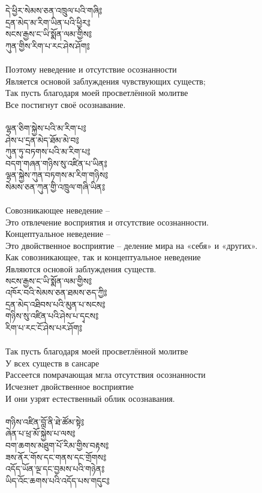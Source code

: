 \newpage
{\ti
དེ་ཕྱིར་སེམས་ཅན་འཁྲུལ་པའི་གཞི༔ \\
དྲན་མེད་མ་རིག་ཡིན་པའི་ཕྱིར༔ \\
སངས་རྒྱས་ང་ཡི་སྨོན་ལམ་གྱིས༔ \\
ཀུན་གྱིས་རིག་པ་རང་ཤེས་ཤོག༔}\\
\\
 Поэтому неведение и отсутствие осознанности \\
Является основой заблуждения чувствующих существ; \\
Так пусть благодаря моей просветлённой молитве \\
Все постигнут своё осознавание. \\
\\
{\ti
ལྷན་ཅིག་སྐྱེས་པའི་མ་རིག་པ༔ \\
ཤེས་པ་དྲན་མེད་ཐོམ་མེ་བ༔ \\
ཀུན་ཏུ་བཏགས་པའི་མ་རིག་པ༔ \\
བདག་གཞན་གཉིས་སུ་འཛིན་པ་ཡིན༔ \\
ལྷན་སྐྱེས་ཀུན་བཏགས་མ་རིག་གཉིས༔ \\
སེམས་ཅན་ཀུན་གྱི་འཁྲུལ་གཞི་ཡིན༔}\\
\\
Совозникающее неведение – \\
Это отвлечение восприятия и отсутствие осознанности. \\
Концептуальное неведение – \\
Это двойственное восприятие – деление мира на «себя» и «других». \\
Как совозникающее, так и концептуальное неведение \\
Являются основой заблуждения существ.\\
\newpage
{\ti
སངས་རྒྱས་ང་ཡི་སྨོན་ལམ་གྱིས༔ \\
འཁོར་བའི་སེམས་ཅན་ཐམས་ཅད་ཀྱི༔ \\
དྲན་མེད་འཐིབས་པའི་མུན་པ་སངས༔ \\
གཉིས་སུ་འཛིན་པའི་ཤེས་པ་དྭངས༔ \\
རིག་པ་རང་ངོ་ཤེས་པར་ཤོག༔}\\
\\
Так пусть благодаря моей просветлённой молитве \\
У всех существ в сансаре \\
Рассеется помрачающая мгла отсутствия осознанности \\
Исчезнет двойственное восприятие \\
И они узрят естественный облик осознавания.\\
\\
{\ti
གཉིས་འཛིན་བློ་ནི་ཐེ་ཚོམ་སྟེ༔ \\
ཞེན་པ་ཕྲ་མོ་སྐྱེས་པ་ལས༔ \\
བག་ཆགས་མཐུག་པོ་རིམ་གྱིས་བརྟས༔ \\
ཟས་ནོར་གོས་དང་གནས་དང་གྲོགས༔ \\
འདོད་ཡོན་ལྔ་དང་བྱམས་པའི་གཉེན༔ \\
ཡིད་འོང་ཆགས་པའི་འདོད་པས་གདུང༔}\\
